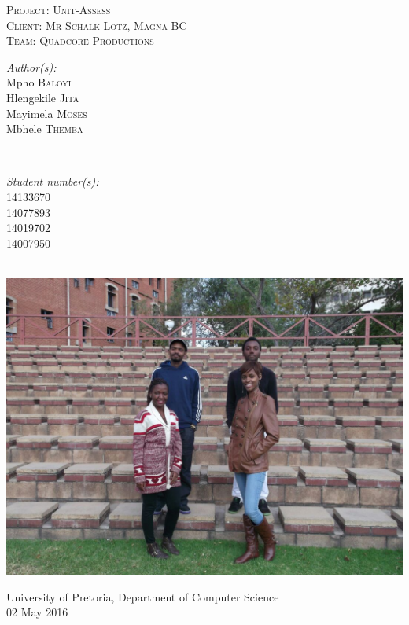 \documentclass[a4paper,12pt]{article}
\begin{document}
\begin{titlepage}
\center

\textsc{\LARGE Project: Unit-Assess}\\[1.5cm]
\textsc{\Large Client: Mr Schalk Lotz, Magna BC}\\[0.5cm]
\textsc{\large Team: Quadcore Productions}\\[0.5cm]

\begin{minipage}{0.4\textwidth}
\begin{flushleft} \large
\emph{Author(s):}\\
Mpho \textsc{Baloyi}\\
Hlengekile \textsc{Jita}\\
Mayimela \textsc{Moses}\\
Mbhele \textsc{Themba}\\
\end{flushleft}
\end{minipage}
~
\begin{minipage}{0.4\textwidth}
\begin{flushright} \large
\emph{Student number(s):} \\
14133670\\ %
14077893\\
14019702\\
14007950\\
\end{flushright}
\end{minipage}\\

\includegraphics[width=\textwidth]{images/GroupPhoto}

{\large University of Pretoria, Department of Computer Science}\\

{\large 02 May 2016}\\[3cm]

\vfil

\end{titlepage}
\end{document}
